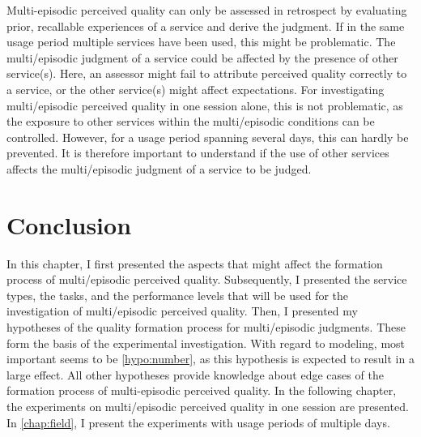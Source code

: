 Multi-episodic perceived quality can only be assessed in retrospect by evaluating prior, recallable experiences of a service and derive the judgment.
If in the same usage period multiple services have been used, this might be problematic.
The multi\-/episodic judgment of a service could be affected by the presence of other service(s).
Here, an assessor might fail to attribute perceived quality correctly to a service, or the other service(s) might affect expectations.
For investigating multi\-/episodic perceived quality in one session alone, this is not problematic, as the exposure to other services within the multi\-/episodic conditions can be controlled.
However, for a usage period spanning several days, this can hardly be prevented.
It is therefore important to understand if the use of other services affects the multi\-/episodic judgment of a service to be judged.

\section{Conclusion}
In this chapter, I first presented the aspects that might affect the formation process of multi\-/episodic perceived quality.
Subsequently, I presented the service types, the tasks, and the performance levels that will be used for the investigation of multi\-/episodic perceived quality.
Then, I presented my hypotheses of the quality formation process for multi\-/episodic judgments.
These form the basis of the experimental investigation.
With regard to modeling, most important seems to be \autoref{hypo:number}, as this hypothesis is expected to result in a large effect.
All other hypotheses provide knowledge about edge cases of the formation process of multi-episodic perceived quality.
In the following chapter, the experiments on multi\-/episodic perceived quality in one session are presented.
In \autoref{chap:field}, I present the experiments with usage periods of multiple days. 
